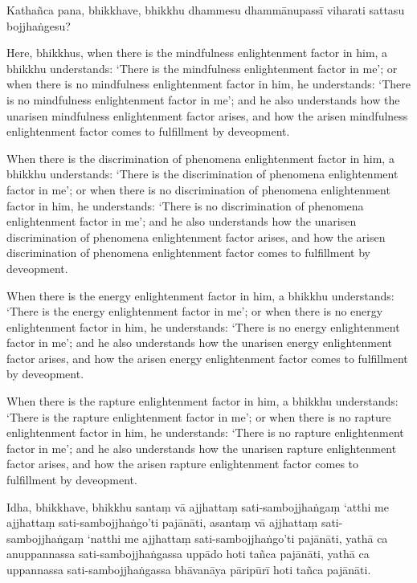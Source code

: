 Kathañca pana, bhikkhave, bhikkhu dhammesu dhammānupassī viharati sattasu
bojjhaṅgesu?

\englishPage

Here, bhikkhus, when there is the mindfulness enlightenment factor in him, a
bhikkhu understands: `There is the mindfulness enlightenment factor in me'; or
when there is no mindfulness enlightenment factor in him, he understands: `There
is no mindfulness enlightenment factor in me'; and he also understands how the
unarisen mindfulness enlightenment factor arises, and how the arisen mindfulness
enlightenment factor comes to fulfillment by deveopment.

When there is the discrimination of phenomena enlightenment factor in him, a
bhikkhu understands: `There is the discrimination of phenomena enlightenment
factor in me'; or when there is no discrimination of phenomena enlightenment
factor in him, he understands: `There is no discrimination of phenomena
enlightenment factor in me'; and he also understands how the unarisen
discrimination of phenomena enlightenment factor arises, and how the arisen
discrimination of phenomena enlightenment factor comes to fulfillment by
deveopment.

When there is the energy enlightenment factor in him, a bhikkhu understands:
`There is the energy enlightenment factor in me'; or when there is no energy
enlightenment factor in him, he understands: `There is no energy enlightenment
factor in me'; and he also understands how the unarisen energy enlightenment
factor arises, and how the arisen energy enlightenment factor comes to
fulfillment by deveopment.

When there is the rapture enlightenment factor in him, a bhikkhu understands:
`There is the rapture enlightenment factor in me'; or when there is no rapture
enlightenment factor in him, he understands: `There is no rapture enlightenment
factor in me'; and he also understands how the unarisen rapture enlightenment
factor arises, and how the arisen rapture enlightenment factor comes to
fulfillment by deveopment.

\paliPage

Idha, bhikkhave, bhikkhu
santaṃ vā ajjhattaṃ sati-sambojjhaṅgaṃ ‘atthi me ajjhattaṃ sati-sambojjhaṅgo’ti pajānāti,
asantaṃ vā ajjhattaṃ sati-sambojjhaṅgaṃ ‘natthi me ajjhattaṃ sati-sambojjhaṅgo’ti pajānāti,
yathā ca anuppannassa sati-sambojjhaṅgassa uppādo hoti tañca pajānāti,
yathā ca uppannassa sati-sambojjhaṅgassa bhāvanāya pāripūrī hoti tañca pajānāti.

